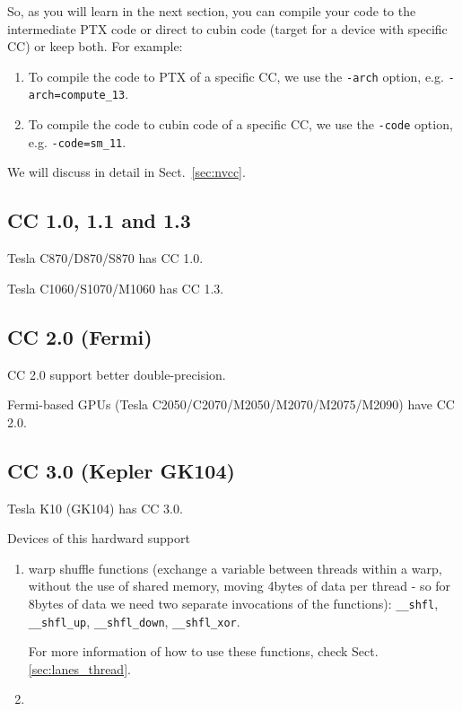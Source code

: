 So, as you will learn in the next section, you can compile your code
to the intermediate PTX code or direct to cubin code (target for a
device with specific CC) or keep both. For example:
\begin{enumerate}
\item To compile the code to PTX of a specific CC, we use the
  \verb!-arch!  option, e.g. \verb!-arch=compute_13!.
\item To compile the code to cubin code of a specific CC, we use the
  \verb!-code! option, e.g. \verb!-code=sm_11!.
\end{enumerate}
We will discuss in detail in Sect.~\ref{sec:nvcc}.

\subsection{CC 1.0, 1.1 and 1.3}

Tesla C870/D870/S870 has CC 1.0. 

Tesla C1060/S1070/M1060 has CC 1.3.

 
\subsection{CC 2.0 (Fermi)}
\label{sec:CC2.0}

CC 2.0 support better double-precision.  

Fermi-based GPUs (Tesla C2050/C2070/M2050/M2070/M2075/M2090) have CC 2.0.




\subsection{CC 3.0 (Kepler GK104)}
\label{sec:CC3.0}

Tesla K10 (GK104) has CC 3.0.

Devices of this hardward support
\begin{enumerate}
  \item warp shuffle functions (exchange a variable between threads within a
  warp, without the use of shared memory, moving 4bytes of data per thread -
  so for 8bytes of data we need two separate invocations of the functions):
  \verb!__shfl!, \verb!__shfl_up!, \verb!__shfl_down!, \verb!__shfl_xor!.
  
For more information of how to use these functions, check
Sect.\ref{sec:lanes_thread}. 

  \item 
\end{enumerate}


